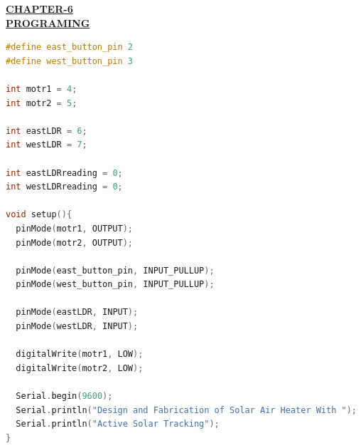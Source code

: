 \begin{center}
  {\fontsize{15}{18}\selectfont \bfseries \textcolor{red!80!black}{\underline{CHAPTER-6}}}\\[2mm]
  {\fontsize{16}{20}\selectfont \bfseries \textcolor{red!80!black}{\underline{PROGRAMING}}}\\[5mm]
\end{center}

\begin{lstlisting}[language=C++]
#define east_button_pin 2 
#define west_button_pin 3

int motr1 = 4; 
int motr2 = 5;

int eastLDR = 6; 
int westLDR = 7;

int eastLDRreading = 0; 
int westLDRreading = 0;

void setup(){ 
  pinMode(motr1, OUTPUT); 
  pinMode(motr2, OUTPUT);

  pinMode(east_button_pin, INPUT_PULLUP); 
  pinMode(west_button_pin, INPUT_PULLUP);

  pinMode(eastLDR, INPUT); 
  pinMode(westLDR, INPUT);

  digitalWrite(motr1, LOW); 
  digitalWrite(motr2, LOW);

  Serial.begin(9600);
  Serial.println("Design and Fabrication of Solar Air Heater With "); 
  Serial.println("Active Solar Tracking");
}
\end{lstlisting}
\clearpage
